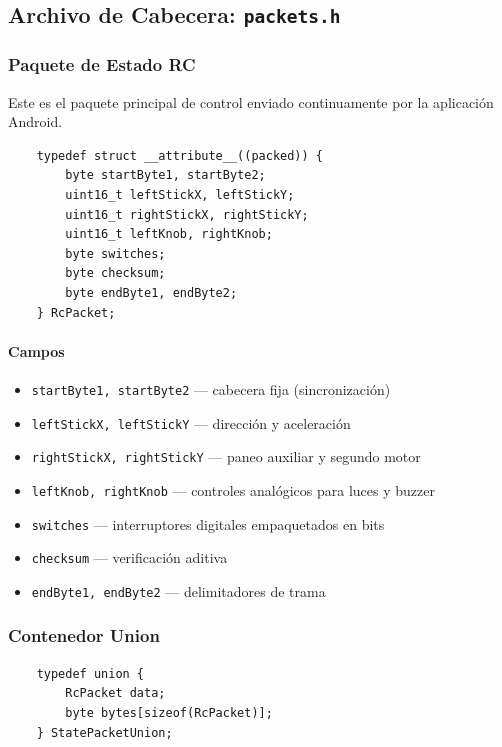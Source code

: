 \documentclass[12pt,a4paper]{article}
\newcommand{\ardfnDG}[1]{\texttt{\textcolor{arduinoTeal}{#1}}}
\begin{document}
\subsection{Archivo de Cabecera: \ardfnDG{packets.h}}

\subsubsection{Paquete de Estado RC}

Este es el paquete principal de control enviado continuamente por la
aplicación Android.

\begin{lstlisting}
	typedef struct __attribute__((packed)) {
		byte startByte1, startByte2;
		uint16_t leftStickX, leftStickY;
		uint16_t rightStickX, rightStickY;
		uint16_t leftKnob, rightKnob;
		byte switches;
		byte checksum;
		byte endByte1, endByte2;
	} RcPacket;
\end{lstlisting}

\paragraph{Campos}

\begin{itemize}
	\item \texttt{startByte1, startByte2} — cabecera fija (sincronización)
	\item \texttt{leftStickX, leftStickY} — dirección y aceleración
	\item \texttt{rightStickX, rightStickY} — paneo auxiliar y segundo motor
	\item \texttt{leftKnob, rightKnob} — controles analógicos para luces y buzzer
	\item \texttt{switches} — interruptores digitales empaquetados en bits
	\item \texttt{checksum} — verificación aditiva
	\item \texttt{endByte1, endByte2} — delimitadores de trama
\end{itemize}

\subsubsection{Contenedor Union}

\begin{lstlisting}
	typedef union {
		RcPacket data;
		byte bytes[sizeof(RcPacket)];
	} StatePacketUnion;
\end{lstlisting}
\end{document}
